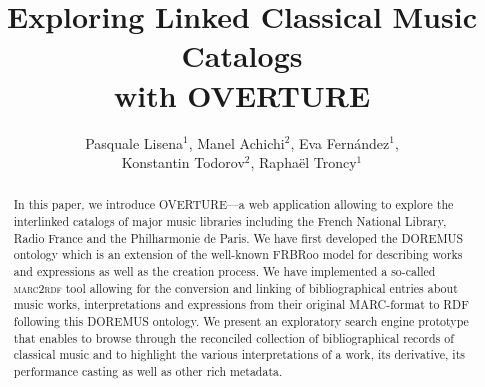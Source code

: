 \documentclass[runningheads,a4paper]{llncs}
\begin{document}
\title{Exploring Linked Classical Music Catalogs\\ with OVERTURE}

\author{Pasquale Lisena$^1$, Manel Achichi$^2$, Eva Fern\'{a}ndez$^1$, \\ Konstantin Todorov$^2$, Rapha\"{e}l Troncy$^1$}

\maketitle


\begin{abstract}
In this paper, we introduce OVERTURE---a web application allowing to explore the interlinked catalogs of major music libraries including the French National Library, Radio France and the Philharmonie de Paris. We have first developed the DOREMUS ontology which is an extension of the well-known FRBRoo model for describing works and expressions as well as the creation process. We have implemented a so-called \textsc{marc2rdf} tool allowing for the conversion and linking of bibliographical entries about music works, interpretations and expressions from their original MARC-format to RDF following this DOREMUS ontology. We present an exploratory search engine prototype that enables to browse through the reconciled collection of bibliographical records of classical music and to highlight the various interpretations of a work, its derivative, its performance casting as well as other rich metadata.
\end{abstract}

\end{document}
